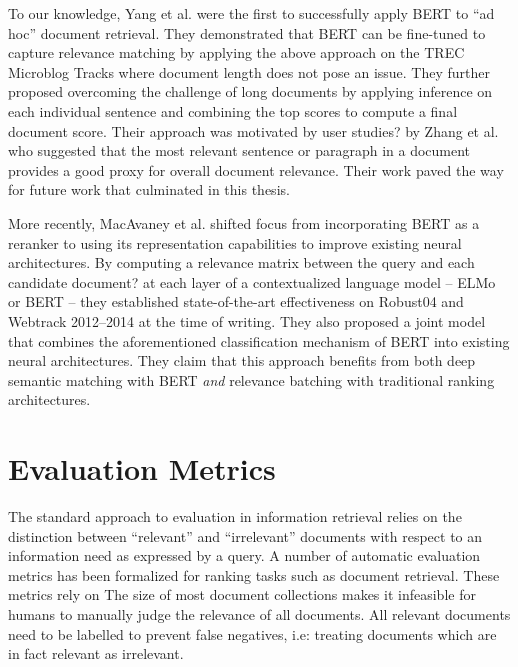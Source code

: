 To our knowledge, Yang et al. \cite{yang2019simple} were the first to successfully apply BERT to ``ad hoc'' document retrieval.
They demonstrated that BERT can be fine-tuned to capture relevance matching by applying the above approach on the TREC Microblog Tracks where document length does not pose an issue.
They further proposed overcoming the challenge of long documents by applying inference on each individual sentence and combining the top scores to compute a final document score.
Their approach was motivated by user studies? by Zhang et al. \cite{zhang2018effective} who suggested that the most relevant sentence or paragraph in a document provides a good proxy for overall document relevance.
Their work paved the way for future work that culminated in this thesis.

More recently, MacAvaney et al. \cite{macavaney2019cedr} shifted focus from incorporating BERT as a reranker to using its representation capabilities to improve existing neural architectures.
By computing a relevance matrix between the query and each candidate document? at each layer of a contextualized language model -- ELMo or BERT --  they established state-of-the-art effectiveness on Robust04 and Webtrack 2012--2014 at the time of writing.
They also proposed a joint model that combines the aforementioned classification mechanism of BERT into existing neural architectures.
They claim that this approach benefits from both deep semantic matching with BERT \textit{and} relevance batching with traditional ranking architectures.


\section{Evaluation Metrics}

The standard approach to evaluation in information retrieval relies on the distinction between ``relevant'' and ``irrelevant'' documents with respect to an information need as expressed by a query.
A number of automatic evaluation metrics has been formalized for ranking tasks such as document retrieval.
These metrics rely on 
The size of most document collections makes it infeasible for humans to manually judge the relevance of all documents.
All relevant documents need to be labelled to prevent false negatives, i.e: treating documents which are in fact relevant as irrelevant.

